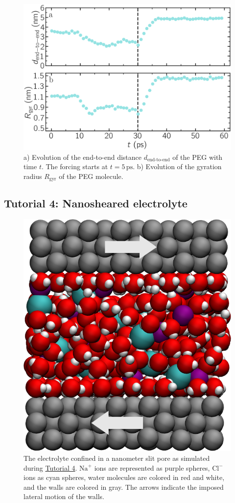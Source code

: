 \documentclass[9pt,tutorial]{livecoms}
\begin{document}
\begin{figure}
\centering
\includegraphics[width=\linewidth]{PEG-distance}
\caption{a) Evolution of the end-to-end distance $d_\text{end-to-end}$ of the PEG with time $t$. The forcing starts at $t = 5\,\text{ps}$. b) Evolution of the gyration radius $R_\text{gyr}$ of the PEG molecule.}
\label{fig:PEG-distance}
\end{figure}

\subsection{Tutorial 4: Nanosheared electrolyte}
\label{sheared-confined-label}

\begin{figure}
\centering
\includegraphics[width=0.55\linewidth]{NANOSHEAR}
\caption{The electrolyte confined in a nanometer slit pore as simulated during \hyperref[sheared-confined-label]{Tutorial 4}. $\text{Na}^+$ ions are represented as purple spheres, $\text{Cl}^-$ ions as cyan spheres, water molecules are colored in red and white, and the walls are colored in gray. The arrows indicate the imposed lateral motion of the walls.}
\label{fig:NANOSHEAR}
\end{figure}
\end{document}
